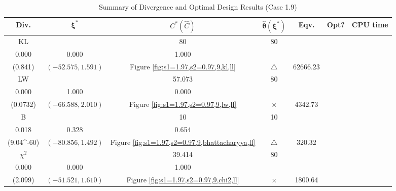 \documentclass[12pt, a4paper]{article}
\begin{document}
\begin{table}[H]
\centering
\renewcommand{\arraystretch}{1.5} %
\setlength{\tabcolsep}{8pt} %
\begin{tabular}{|c|c|c|c|c|c|c|}
\hline
\textbf{Div.} & \(\boldsymbol{\xi^*}\) & \(C^* (\hat{C})\) & \(\boldsymbol{\hat{\theta}(\xi^*)}\) & \textbf{Eqv.} & \textbf{Opt?} & \textbf{CPU time} \\
\hline
KL & \(\left\{\begin{array}{ccc}
76.132 & 80 & 80 \\
0.000 & 0.000 & 1.000
\end{array}\right\}\) &
\(\begin{array}{c}
0.841 \\
(0.841)
\end{array}\) & 
\((-52.575, 1.591)\) & 
Figure \ref{fig:s1=1.97,s2=0.97,9,kl,ll} & $\triangle$ & 62666.23 \\
\hline
LW & \(\left\{\begin{array}{ccc}
52.005 & 57.073 & 80 \\
0.000 & 1.000 & 0.000
\end{array}\right\}\) &
\(\begin{array}{c}
0.0751 \\
(0.0732)
\end{array}\) & 
\((-66.588, 2.010)\) & 
Figure \ref{fig:s1=1.97,s2=0.97,9,lw,ll} & $\times$ & 4342.73 \\
\hline
B & \(\left\{\begin{array}{ccc}
10 & 10 & 10 \\
0.018 & 0.328 & 0.654
\end{array}\right\}\) &
\(\begin{array}{c}
1.000 \\
(9.04\times 10^{-60})
\end{array}\) & 
\((-80.856, 1.492)\) & 
Figure \ref{fig:s1=1.97,s2=0.97,9,bhattacharyya,ll} & $\triangle$ & 320.32 \\
\hline
\(\chi^2\) & \(\left\{\begin{array}{ccc}
34.004 & 39.414 & 80 \\
0.000 & 0.000 & 1.000
\end{array}\right\}\) &
\(\begin{array}{c}
5.11\times 10^{11} \\
(2.099)
\end{array}\) & 
\((-51.521, 1.610)\) & 
Figure \ref{fig:s1=1.97,s2=0.97,9,chi2,ll} & $\times$ & 1800.64 \\
\hline
\end{tabular}
\caption{Summary of Divergence and Optimal Design Results (Case 1.9)}
\label{tab:results1.9}
\end{table}
\end{document}
